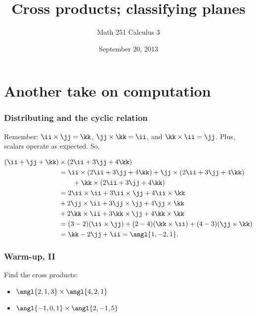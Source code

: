 \documentclass[11pt,ignorenonframetext,xcolor={svgnames},aspectratio=169]{beamer}
\title{Cross products; classifying planes}
\author{Math 251 Calculus 3}
\date{September 20, 2013 }
\begin{document}
\frame{\titlepage}

\section{Another take on computation}

\begin{frame}\frametitle{Distributing and the cyclic relation}

Remember: $\ii \times \jj = \kk$, $\jj \times \kk = \ii$, and
$\kk \times \ii = \jj$. Plus, scalars operate as expected. So,

\begin{align*}
    (\ii + \jj + \kk) &\times (2 \ii + 3 \jj + 4 \kk) \\
    &= \ii \times (2 \ii + 3 \jj + 4 \kk) + \jj \times (2 \ii + 3 \jj + 4 \kk) \\
    &\qquad + \kk \times (2 \ii + 3 \jj + 4 \kk) \\
    &= 2 \ii \times \ii + 3 \ii \times \jj + 4 \ii \times \kk \\
    &+ 2 \jj \times \ii + 3 \jj \times \jj + 4 \jj \times \kk \\
    &+ 2 \kk \times \ii + 3 \kk \times \jj + 4 \kk \times \kk \\
    &= (3-2)(\ii \times \jj) + (2-4)(\kk \times \ii) + (4-3)(\jj \times \kk) \\
    &= \kk - 2 \jj + \ii = \angl{1, -2, 1}.
\end{align*}

\end{frame}

\begin{frame}\frametitle{Warm-up, II}

Find the cross products:

\begin{itemize}

\item
  $\angl{2, 1, 3} \times \angl{4, 2, 1}$
\item
  $\angl{-1, 0, 1} \times \angl{2, -1, 5}$
\end{itemize}

\end{frame}
\end{document}
